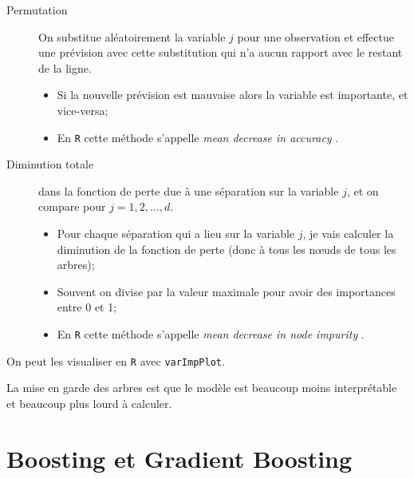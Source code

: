 \documentclass[10pt, french]{article}
\begin{document}
\begin{multicols*}{3}
\begin{description}
	\item[Permutation]	On substitue aléatoirement la variable $j$ pour une observation et effectue une prévision avec cette substitution qui n'a aucun rapport avec le restant de la ligne.
		\begin{itemize}[leftmargin = *]
		\item	Si la nouvelle prévision est mauvaise alors la variable est importante, et vice-versa;
		\item	En \texttt{R} cette méthode s'appelle \og \textit{mean decrease in accuracy} \fg{}.
		\end{itemize}
	\item[Diminution totale]	dans la fonction de perte due à une séparation sur la variable $j$, et on compare pour $j = 1, 2, \dots, d$.
		\begin{itemize}[leftmargin = *]
		\item	Pour chaque séparation qui a lieu sur la variable $j$, je vais calculer la diminution de la fonction de perte (donc à tous les nœuds de tous les arbres);
		\item	Souvent on divise par la valeur maximale pour avoir des importances entre 0 et 1;
		\item	En \texttt{R} cette méthode s'appelle \og \textit{mean decrease in node impurity} \fg{}.
		\end{itemize}
\end{description}
On peut les visualiser en \texttt{R} avec \texttt{varImpPlot}.

La mise en garde des arbres est que le modèle est beaucoup moins interprétable et beaucoup plus lourd à calculer.

\newpage

\section{Boosting et Gradient Boosting}


\end{multicols*}
\end{document}
